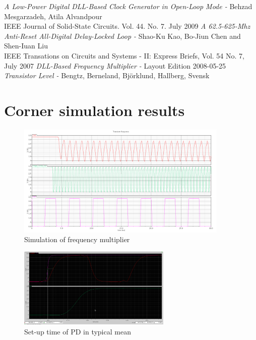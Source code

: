 \documentclass[a4paper,12pt]{article} \usepackage{graphicx}
\begin{document}
\begin{thebibliography}{99}
        \textit{A Low-Power Digital DLL-Based Clock Generator in Open-Loop Mode - }
                Behzad Mesgarzadeh, Atila Alvandpour \\
                IEEE Journal of Solid-State Circuits. Vol. 44. No. 7. July 2009
        \textit{A 62.5-625-Mhz Anti-Reset All-Digital Delay-Locked Loop - }
                Shao-Ku Kao, Bo-Jiun Chen and Shen-Iuan Liu \\
                IEEE Transations on Circuits and Systems - II: Express Briefs, Vol. 54 No. 7, July 2007
        \textit{DLL-Based Frequency Multiplier - }
                Layout Edition 2008-05-25 \\
        \textit{Transistor Level - }
                Bengtz, Berneland, Björklund, Hallberg, Svensk \\

\end{thebibliography}

\newpage
\section{Corner simulation results}
\label{sec:corners}

\begin{figure}[h]
        \centering
        \includegraphics[width=0.9\textwidth]{../Bilder/freq_mult_layout_sim.png}
        \caption{Simulation of frequency multiplier}
        \label{fig:freq_mult_sim}
\end{figure}

\begin{figure}[h]
  \centering
  \includegraphics[width=0.65\textwidth]{../Bilder/Layout/simulations/pd_tm.png}
  \caption{Set-up time of PD in typical mean}
  \label{fig:PDtm}
\end{figure}
\end{document}
